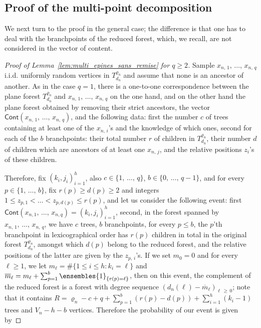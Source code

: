 \documentclass[10pt]{amsart}
\theoremstyle{definition}\newtheorem{defi}[theo]{Definition}\newtheorem{rema}[theo]{Remark}\newtheorem{exam}[theo]{Example}\newtheorem{exem}[theo]{Example}\newtheorem{nota}[theo]{Notation}
\newcommand{\1}{\ensembles{1}}
\newcommand{\ind}[1]{\1_{\{#1\}}}
\renewcommand{\le}{\leqslant}
\renewcommand{\ge}{\geqslant}
\newcommand{\Cont}{\mathsf{Cont}}
\newcommand{\fn}{T_{d_n}^{\varrho_n}}
\newcommand{\vertices}{V}
\providecommand{\?}{}
\begin{document}
\subsection{Proof of the multi-point decomposition}


We next turn to the proof in the general case; the difference is that one has to deal with the branchpoints of the reduced forest, which, we recall, are not considered in the vector of content.

\begin{proof}[Proof of Lemma~\ref{lem:multi_epines_sans_remise} for $q \ge 2$]
Sample $x_{n,\,1},\,\dots,\,x_{n,\,q}$ i.i.d. uniformly random vertices in $\fn$ and assume that none is an ancestor of another. As in the case $q=1$, there is a one-to-one correspondence between the plane forest $\fn$ and $x_{n,\,1},\,\dots,\,x_{n,\,q}$ on the one hand, and on the other hand the plane forest obtained by removing their strict ancestors, the vector $\Cont(x_{n,\,1},\, \dots,\,x_{n,\,q})$, and the following data: first the number $c$ of trees containing at least one of the $x_{n,\,i}$'s and the knowledge of which ones, second for each of the $b$ branchpoints: their total number $r$ of children in $\fn$, their number $d$ of children which are ancestors of at least one $x_{n,\,j}$, and the relative positions $z_i$'s of these children.


Therefore, fix $(k_i, j_i)_{i=1}^h$, also $c \in \{1, \,\dots,\,q\}$, $b \in \{0,\,\dots,\,q-1\}$, and for every $p \in \{1,\,\dots,\,b\}$, fix $r(p) \ge d(p) \ge 2$ and integers $1 \le z_{p,1} < \dots < z_{p, d(p)} \le r(p)$, and let us consider the following event: first $\Cont(x_{n,1},\,\dots,\,x_{n,q}) = (k_i, j_i)_{i=1}^h$, second, in the forest spanned by $x_{n,\,1},\,\dots, \,x_{n,\,q}$, we have $c$ trees, $b$ branchpoints, for every $p \le b$, the $p$'th branchpoint in lexicographical order has $r(p)$ children in total in the original forest $\fn$, amongst which $d(p)$ belong to the reduced forest, and the relative positions of the latter are given by the $z_{p,\,i}$'s. If we set $m_0 = 0$ and for every $\ell \ge 1$, we let $m_\ell = \#\{1 \le i \le h : k_i = \ell\}$ and $\overline{m}_\ell = m_\ell + \sum_{p=1}^b \ind{r(p) = \ell}$, then on this event, the complement of the reduced forest is a forest with degree sequence $(d_n(\ell)-\overline{m}_\ell)_{\ell\,\ge\,0}$; note that it contains $R = \varrho_n - c + q + \sum_{p=1}^b (r(p) - d(p)) + \sum_{i=1}^h (k_i - 1)$ trees and $\vertices_n - h - b$ vertices. Therefore the probability of our event is given by


\end{proof}
\end{document}
